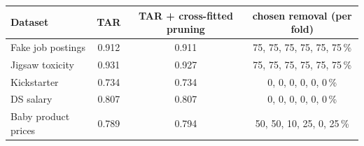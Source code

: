 \begin{tabular}{lccc}
\toprule
Dataset & TAR & TAR + cross-fitted pruning & chosen removal (per fold) \\
\midrule
Fake job postings & 0.912 & 0.911 & 75, 75, 75, 75, 75, 75\,\% \\
Jigsaw toxicity & 0.931 & 0.927 & 75, 75, 75, 75, 75, 75\,\% \\
Kickstarter & 0.734 & 0.734 & 0, 0, 0, 0, 0, 0\,\% \\
DS salary & 0.807 & 0.807 & 0, 0, 0, 0, 0, 0\,\% \\
Baby product prices & 0.789 & 0.794 & 50, 50, 10, 25, 0, 25\,\% \\
\bottomrule
\end{tabular}
